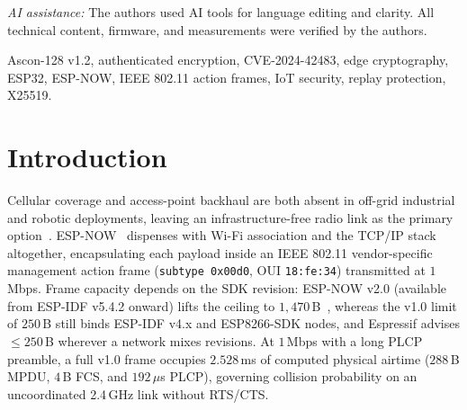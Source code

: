 \documentclass[conference]{IEEEtran}
\begin{document}
\textit{AI assistance:} The authors used AI tools for language editing and clarity. All technical content, firmware, and measurements were verified by the authors.

\begin{IEEEkeywords}
Ascon-128 v1.2, authenticated encryption, CVE-2024-42483, edge cryptography, ESP32, ESP-NOW, IEEE 802.11 action frames, IoT security, replay protection, X25519.
\end{IEEEkeywords}

\section{Introduction}
Cellular coverage and access-point backhaul are both absent in off-grid industrial and robotic deployments, leaving an infrastructure-free radio link as the primary option~\cite{montiel2026}. ESP-NOW~\cite{espressif_espnow} dispenses with Wi-Fi association and the TCP/IP stack altogether, encapsulating each payload inside an IEEE 802.11 vendor-specific management action frame (\texttt{subtype 0x00d0}, OUI \texttt{18:fe:34}) transmitted at $1$\,Mbps. Frame capacity depends on the SDK revision: ESP-NOW v2.0 (available from ESP-IDF v5.4.2 onward) lifts the ceiling to $1{,}470$\,B~\cite{espressif_espnow}, whereas the v1.0 limit of $250$\,B still binds ESP-IDF v4.x and ESP8266-SDK nodes, and Espressif advises $\le 250$\,B wherever a network mixes revisions. At $1$\,Mbps with a long PLCP preamble, a full v1.0 frame occupies $2.528$\,ms of computed physical airtime ($288$\,B MPDU, $4$\,B FCS, and $192\,\mu$s PLCP), governing collision probability on an uncoordinated 2.4\,GHz link without RTS/CTS.
\end{document}
